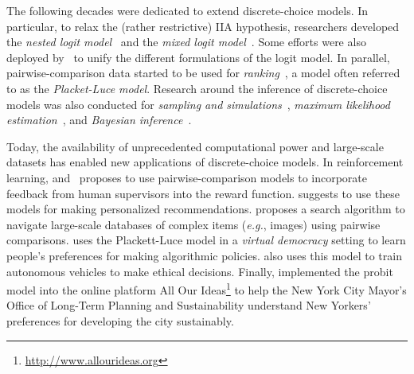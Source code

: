 The following decades were dedicated to extend discrete-choice models.
In particular, to relax the (rather restrictive) IIA hypothesis, researchers developed the \emph{nested logit model}~\citep{ben1973structure,williams1977formation,mcfadden1978modelling} and the \emph{mixed logit model}~\citep{boyd1980effect,cardell1980measuring,hensher2003mixed}.
Some efforts were also deployed by~\citet{yellot1977relationship} to unify the different formulations of the logit model.
In parallel, pairwise-comparison data started to be used for \emph{ranking}~\citep{ford1957solution,buehlmann1963pairwise,plackett1975analysis,wauthier2013efficient,negahban2017rank}, a model often referred to as the \emph{Placket-Luce model}.
Research around the inference of discrete-choice models was also conducted for \emph{sampling and simulations}~\citep{manski1981alternative,cosslett1981efficient}, \emph{maximum likelihood estimation}~\citep{hastie1998classification,hunter2004mm,maystre2015fast,vojnovic2016parameter}, and \emph{Bayesian inference}~\citep{guiver2009bayesian,caron2012efficient,houlsby2012collaborative}.

Today, the availability of unprecedented computational power and large-scale datasets has enabled new applications of discrete-choice models.
In reinforcement learning, \citet{sadigh2017active} and~\citet{christiano2017deep} proposes to use pairwise-comparison models to incorporate feedback from human supervisors into the reward function.
\citet{ammar2015ranked} suggests to use these models for making personalized recommendations.
\citet{chumbalov2020scalable} proposes a search algorithm to navigate large-scale databases of complex items (\textit{e.g.}, images) using pairwise comparisons.
\citet{lee2019webuildai} uses the Plackett-Luce model in a \emph{virtual democracy} setting to learn people's preferences for making algorithmic policies.
\citet{noothigattu2018voting} also uses this model to train autonomous vehicles to make ethical decisions.
Finally, \citet{salganik2015wiki} implemented the probit model into the online platform All Our Ideas\footnote{\href{http://www.allourideas.org/planyc_example?guides=true}{http://www.allourideas.org}} to help the New York City Mayor’s Office of Long-Term Planning and Sustainability understand New Yorkers' preferences for developing the city sustainably.

